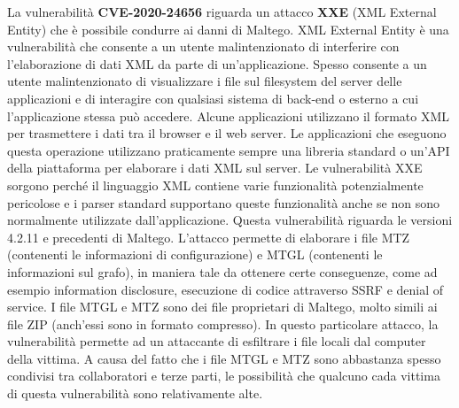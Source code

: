 \begin{flushleft}
La vulnerabilità \textbf{CVE-2020-24656} riguarda un attacco \textbf{XXE} (XML External Entity) che è possibile condurre ai danni di Maltego. XML External Entity è una vulnerabilità che consente a un utente malintenzionato di interferire con l'elaborazione di dati XML da parte di un'applicazione. Spesso consente a un utente malintenzionato di visualizzare i file sul filesystem del server delle applicazioni e di interagire con qualsiasi sistema di back-end o esterno a cui l'applicazione stessa può accedere. Alcune applicazioni utilizzano il formato XML per trasmettere i dati tra il browser e il web server. Le applicazioni che eseguono questa operazione utilizzano praticamente sempre una libreria standard o un'API della piattaforma per elaborare i dati XML sul server. Le vulnerabilità XXE sorgono perché il linguaggio XML contiene varie funzionalità potenzialmente pericolose e i parser standard supportano queste funzionalità anche se non sono normalmente utilizzate dall'applicazione. Questa vulnerabilità riguarda le versioni 4.2.11 e precedenti di Maltego. L'attacco permette di elaborare i file MTZ (contenenti le informazioni di configurazione) e MTGL (contenenti le informazioni sul grafo), in maniera tale da ottenere certe conseguenze, come ad esempio information disclosure, esecuzione di codice attraverso SSRF e denial of service. I file MTGL e MTZ sono dei file proprietari di Maltego, molto simili ai file ZIP (anch'essi sono in formato compresso). In questo particolare attacco, la vulnerabilità permette ad un attaccante di esfiltrare i file locali dal computer della vittima. A causa del fatto che i file MTGL e MTZ sono abbastanza spesso condivisi tra collaboratori e terze parti, le possibilità che qualcuno cada vittima di questa vulnerabilità sono relativamente alte.
\end{flushleft}